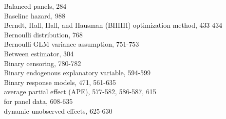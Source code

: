 \documentclass[10pt]{article}
\begin{document}
Balanced panels, 284\\
Baseline hazard, 988\\
Berndt, Hall, Hall, and Hausman (BHHH) optimization method, 433-434\\
Bernoulli distribution, 768\\
Bernoulli GLM variance assumption, 751-753\\
Between estimator, 304\\
Binary censoring, 780-782\\
Binary endogenous explanatory variable, 594-599\\
Binary response models, 471, 561-635\\
average partial effect (APE), 577-582, 586-587, 615\\
for panel data, 608-635\\
dynamic unobserved effects, 625-630
\end{document}

